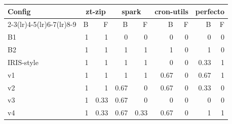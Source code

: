 \begin{tabular}{@{}lrrrrrrrr@{}}
\toprule
Config & \multicolumn{2}{c}{zt-zip} & \multicolumn{2}{c}{spark} & \multicolumn{2}{c}{cron-utils} & \multicolumn{2}{c}{perfecto} \\
\cmidrule(lr){2-3}\cmidrule(lr){4-5}\cmidrule(lr){6-7}\cmidrule(lr){8-9}
 & B & F & B & F & B & F & B & F \\
\midrule
B1 & 1 & 1 & 0 & 0 & 0 & 0 & 0 & 0 \\
B2 & 1 & 1 & 1 & 1 & 1 & 0 & 1 & 0 \\
IRIS-style & 1 & 1 & 1 & 1 & 0 & 0 & 0.33 & 1 \\
v1 & 1 & 1 & 1 & 1 & 0.67 & 0 & 0.67 & 1 \\
v2 & 1 & 1 & 0.67 & 0 & 0.67 & 0 & 0.33 & 0 \\
v3 & 1 & 0.33 & 0.67 & 0 & 0 & 0 & 0 & 0 \\
v4 & 1 & 0.33 & 0.67 & 0.33 & 0.67 & 0 & 1 & 1 \\
\bottomrule
\end{tabular}
